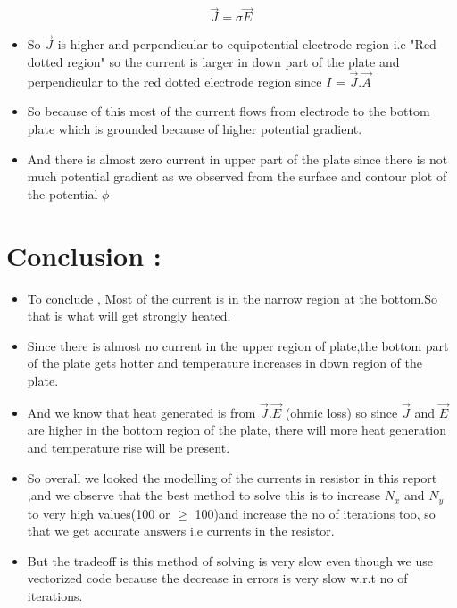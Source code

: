 \documentclass[11pt, a4paper, twoside]{article}
\begin{document}
  \begin{equation}
  \vec{J} = \sigma\vec{E}
     \end{equation}
  
  \begin{itemize}
  \item
    So \(\vec{J}\) is higher and perpendicular to equipotential electrode
    region i.e "Red dotted region" so the current is larger in down part
    of the plate and perpendicular to the red dotted electrode region
    since \(I\) = \(\vec{J}.\vec{A}\)
  \item
    So because of this most of the current flows from electrode to the
    bottom plate which is grounded because of higher potential gradient.
  \item
    And there is almost zero current in upper part of the plate since
    there is not much potential gradient as we observed from the surface
    and contour plot of the potential \(\phi\)
  \end{itemize}
  
    
  
    
      
      \section{Conclusion :}\label{results-and-conclusion}
  
  \begin{itemize}
  \item
    To conclude , Most of the current is in the narrow region at the
    bottom.So that is what will get strongly heated.
  \item
    Since there is almost no current in the upper region of plate,the
    bottom part of the plate gets hotter and temperature increases in down
    region of the plate.
  \item
    And we know that heat generated is from \(\vec{J}.\vec{E}\) (ohmic
    loss) so since \(\vec{J}\) and \(\vec{E}\) are higher in the bottom
    region of the plate, there will more heat generation and temperature
    rise will be present.
  \item
    So overall we looked the modelling of the currents in resistor in this
    report ,and we observe that the best method to solve this is to
    increase \(N_x\) and \(N_y\) to very high values(100 or \(\geq\)
    100)and increase the no of iterations too, so that we get accurate
    answers i.e currents in the resistor.
  \item
    But the tradeoff is this method of solving is very slow even though we
    use vectorized code because the decrease in errors is very slow w.r.t
    no of iterations.
  \end{itemize}
  
\end{document}
